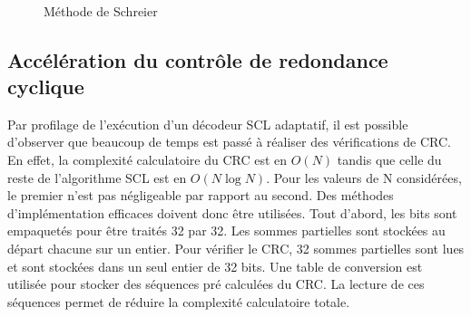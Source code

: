 \begin{figure}
\centering
{}
\\
\caption{Méthode de Schreier}
\label{fig:schreier_sort}
\end{figure}

\subsection{Accélération du contrôle de redondance cyclique}
Par profilage de l'exécution d'un décodeur SCL adaptatif, il est possible d'observer que beaucoup de temps est passé à réaliser des vérifications de CRC. En effet, la complexité calculatoire du CRC est en $O(N)$ tandis que celle du reste de l'algorithme SCL est en $O(N\log N)$. Pour les valeurs de N considérées, le premier n'est pas négligeable par rapport au second. Des méthodes d'implémentation efficaces doivent donc être utilisées. Tout d'abord, les bits sont empaquetés pour être traités 32 par 32. Les sommes partielles sont stockées au départ chacune sur un entier. Pour vérifier le CRC, 32 sommes partielles sont lues et sont stockées dans un seul entier de 32 bits. Une table de conversion est utilisée pour stocker des séquences pré calculées du CRC. La lecture de ces séquences permet de réduire la complexité calculatoire totale.

